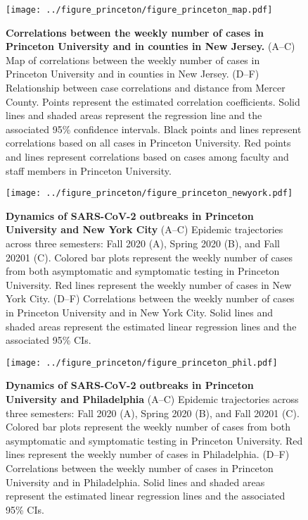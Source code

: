 \documentclass[12pt]{article}
\begin{document}
\pagebreak


\begin{figure}[!htp]
\begin{center}
\texttt{[image: ../figure\_princeton/figure\_princeton\_map.pdf]}
\end{center}
\caption{
\textbf{Correlations between the weekly number of cases in Princeton University and in counties in New Jersey.}
(A--C) Map of correlations between the weekly number of cases in Princeton University and in counties in New Jersey.
(D--F) Relationship between case correlations and distance from Mercer County.
Points represent the estimated correlation coefficients.
Solid lines and shaded areas represent the regression line and the associated 95\% confidence intervals.
Black points and lines represent correlations based on all cases in Princeton University.
Red points and lines represent correlations based on cases among faculty and staff members in Princeton University.
}
\end{figure}


\pagebreak

\begin{figure}[!htp]
\texttt{[image: ../figure\_princeton/figure\_princeton\_newyork.pdf]}
\caption{
\textbf{Dynamics of SARS-CoV-2 outbreaks in Princeton University and New York City}
(A--C) Epidemic trajectories across three semesters: Fall 2020 (A), Spring 2020 (B), and Fall 20201 (C).
Colored bar plots represent the weekly number of cases from both asymptomatic and symptomatic testing in Princeton University.
Red lines represent the weekly number of cases in New York City.
(D--F) Correlations between the weekly number of cases in Princeton University and in New York City.
Solid lines and shaded areas represent the estimated linear regression lines and the associated 95\% CIs.
}
\end{figure}


\pagebreak

\begin{figure}[!htp]
\texttt{[image: ../figure\_princeton/figure\_princeton\_phil.pdf]}
\caption{
\textbf{Dynamics of SARS-CoV-2 outbreaks in Princeton University and Philadelphia}
(A--C) Epidemic trajectories across three semesters: Fall 2020 (A), Spring 2020 (B), and Fall 20201 (C).
Colored bar plots represent the weekly number of cases from both asymptomatic and symptomatic testing in Princeton University.
Red lines represent the weekly number of cases in Philadelphia.
(D--F) Correlations between the weekly number of cases in Princeton University and in Philadelphia.
Solid lines and shaded areas represent the estimated linear regression lines and the associated 95\% CIs.
}
\end{figure}
\end{document}
